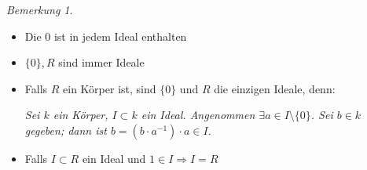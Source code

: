 \documentclass[a4paper,12pt,numbers=noenddot,parskip=full]{scrartcl}
\theoremstyle{dotless}
\theoremstyle{remark}
\newtheorem*{remark}{Bemerkung}
\begin{document}
	\begin{remark}
		\begin{itemize}
			\item Die $0$ ist in jedem Ideal enthalten
			\item $\{ 0 \}, R$ sind immer Ideale
			\item Falls $R$ ein Körper ist, sind $\{ 0 \}$ und $R$ die einzigen Ideale, denn:
			
			\textit{Sei $k$ ein Körper, $I \subset k$ ein Ideal. Angenommen $\exists a \in I \setminus \{ 0 \}$. Sei $b \in k$ gegeben; dann ist $b = (b \cdot a^{-1})\cdot a \in I$.}
			
			\item Falls $I \subset R$ ein Ideal und $1 \in I \Rightarrow I = R$
		\end{itemize}
	\end{remark}
\end{document}
